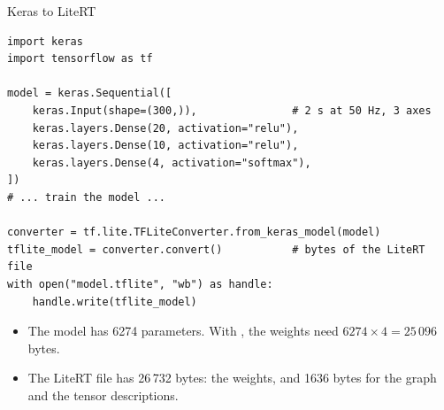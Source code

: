 \begin{frame}[fragile]{Keras to LiteRT}
\begin{lstlisting}[style=python]
import keras
import tensorflow as tf

model = keras.Sequential([
    keras.Input(shape=(300,)),               # 2 s at 50 Hz, 3 axes
    keras.layers.Dense(20, activation="relu"),
    keras.layers.Dense(10, activation="relu"),
    keras.layers.Dense(4, activation="softmax"),
])
# ... train the model ...

converter = tf.lite.TFLiteConverter.from_keras_model(model)
tflite_model = converter.convert()           # bytes of the LiteRT file
with open("model.tflite", "wb") as handle:
    handle.write(tflite_model)
\end{lstlisting}
  \small
  \begin{itemize}
    \item The model has 6274 parameters. With , the weights
          need $6274 \times 4 = 25\,096$ bytes.
    \item The LiteRT file has 26\,732 bytes: the weights, and 1636 bytes
          for the graph and the tensor descriptions.
  \end{itemize}
\end{frame}

